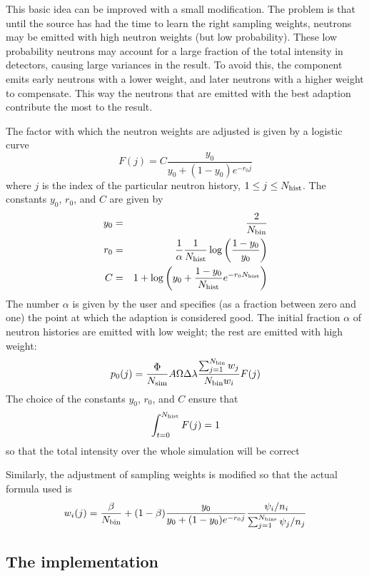 This basic idea can be improved with a small modification. The problem
is that until the source has had the time to learn the right sampling
weights, neutrons may be emitted with high neutron weights (but low
probability). These low probability neutrons may account for a large fraction of
the total intensity in detectors, causing large variances in the
result. To avoid this, the component emits early neutrons with a lower
weight, and later neutrons with a higher weight to compensate. This way
the neutrons that are emitted with the best adaption contribute the most
to the result.

The factor with which the neutron weights are adjusted is given by a
logistic curve
\begin{equation}
  F(j) = C\frac{y_0}{y_0 + (1 - y_0) e^{-r_0 j}}
\end{equation}
where $j$ is the index of the particular neutron history, $1 \leq j
\leq N_{\rm hist}$. The constants $y_0$, $r_0$, and $C$ are given by
\begin{eqnarray}
  y_0 &=& \frac{2}{N_{\rm bin}} \\
  r_0 &=& \frac{1}{\alpha}\frac{1}{N_{\rm hist}}
     \log\left(\frac{1 - y_0}{y_0}\right) \\
  C &=& 1 + \log\left(y_0 + \frac{1 - y_0}{N_{\rm hist}}
     e^{-r_0 N_{\rm hist}}\right)
\end{eqnarray}
The number $\alpha$ is given by the user and specifies (as a fraction
between zero and one) the point at which the adaption is considered
good. The initial fraction $\alpha$ of neutron histories are emitted
with low weight; the rest are emitted with high weight:
$$ p_0(j) =
    \frac{\Phi}{N_{\rm sim}} A \Omega \Delta\lambda
    \frac{\sum_{j=1}^{N_{\rm bin}} w_j}{N_{\rm bin} w_i}
    F(j)
$$
The choice of the constants $y_0$, $r_0$, and $C$ ensure that
$$
\int_{t=0}^{N_{\rm hist}} F(j) = 1
$$
so that the total intensity over the whole simulation will be correct

Similarly, the adjustment of sampling weights is modified so that the
actual formula used is
$$
w_i(j) = \frac{\beta}{N_{\rm bin}} +
    (1-\beta) \frac{y_0}{y_0 + (1 - y_0) e^{-r_0 j}}
     \frac{\psi_i/n_i}{\sum_{j=1}^{N_{\rm bins}} \psi_j/n_j}
$$

\subsection{The implementation}



